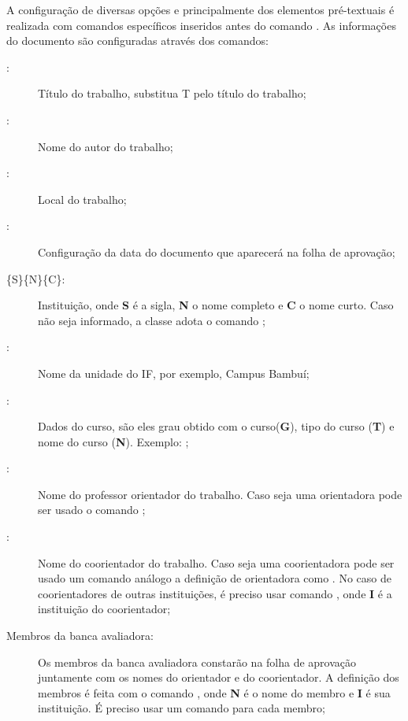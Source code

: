 A configuração de diversas opções e principalmente dos elementos pré-textuais é realizada com comandos específicos inseridos antes do comando . As informações do documento são configuradas através dos comandos:
\begin{description}
\item[:] Título do trabalho, substitua T pelo título do trabalho;
\item[:] Nome do autor do trabalho;
\item[:] Local do trabalho;
\item[:] Configuração da data do documento que aparecerá na folha de aprovação;
\item[\{S\}\{N\}\{C\}:] Instituição, onde \textbf{S} é a sigla, \textbf{N} o nome completo e \textbf{C} o nome curto.
Caso não seja informado, a classe adota o comando ;
\item[:] Nome da unidade do IF, por exemplo, Campus Bambuí;
\item[:] Dados do curso, são eles grau obtido com o curso(\textbf{G}), tipo do curso (\textbf{T}) e nome do curso (\textbf{N}).
Exemplo: ;
\item[:] Nome do professor orientador do trabalho.
Caso seja uma orientadora pode ser usado o comando ;
\item[:] Nome do coorientador do trabalho.
Caso seja uma coorientadora pode ser usado um comando análogo a definição de orientadora como .
No caso de coorientadores de outras instituições, é preciso usar  comando , onde \textbf{I} é a instituição do coorientador;
\item[Membros da banca avaliadora:] Os membros da banca avaliadora constarão na folha de aprovação juntamente com os nomes do orientador e do coorientador.
A definição dos membros é feita com o comando , onde \textbf{N} é o nome do membro e \textbf{I} é sua instituição.
É preciso usar um comando para cada membro;


\end{description}
